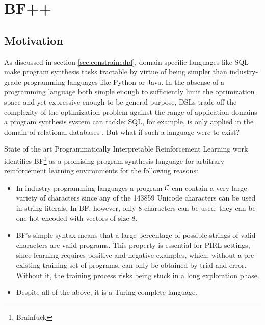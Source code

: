 \chapter{BF++}\label{ch:bfpp}


\section{Motivation}

As discussed in section \ref{sec:constrainedpl}, domain specific languages like SQL make program synthesis tasks tractable by virtue of being simpler than industry-grade programming languages like Python or Java.
In the absense of a programming language both simple enough to sufficiently limit the optimization space and yet expressive enough to be general purpose, DSLs trade off the complexity of the optimization problem against the range of application domains a program synthesis system can tackle: SQL, for example, is only applied in the domain of relational databases \cite{atzeniRelationalDatabaseTheory1993}.
But what if such a language were to exist?

State of the art Programmatically Interpretable Reinforcement Learning work \cite{abolafiaNeuralProgramSynthesis2018} identifies BF\footnote{Brainfuck} \cite{brainfuck} as a promising program synthesis language for arbitrary reinforcement learning environments for the following reasons:
\begin{itemize}
    \item In industry programming languages a program $\mathcal{C}$ can contain a very large variety of characters since any of the 143859 Unicode \cite{allenUnicodeStandard2012} characters can be used in string literals. In BF, however, only 8 characters can be used: they can be one-hot-encoded with vectors of size 8. 
    \item BF's simple syntax means that a large percentage of possible strings of valid characters are valid programs. 
    This property is essential for PIRL settings, since learning requires positive and negative examples, which, without a pre-existing training set of programs, can only be obtained by trial-and-error.
    Without it, the training process risks being stuck in a long exploration phase.
    \item Despite all of the above, it is a Turing-complete language.
\end{itemize}

